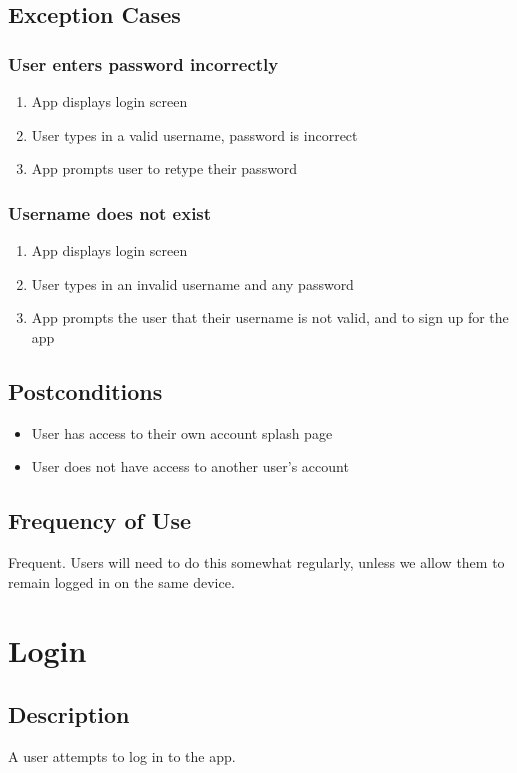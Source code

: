 \documentclass{article}
\begin{document}
	\subsection{Exception Cases}
		\subsubsection{User enters password incorrectly}
			\begin{enumerate}
				\item App displays login screen
				\item User types in a valid username, password is incorrect
				\item App prompts user to retype their password
			\end{enumerate}
		\subsubsection{Username does not exist}
		\begin{enumerate}
			\item App displays login screen
			\item User types in an invalid username and any password
			\item App prompts the user that their username is not valid, and to sign up for the app
		\end{enumerate}
	\subsection{Postconditions}
	\begin{itemize}
		\item User has access to their own account splash page
		\item User does not have access to another user's account
	\end{itemize}

	\subsection{Frequency of Use}
	Frequent. Users will need to do this somewhat regularly, unless we allow them to remain logged in on the same device.
	\section{Login}
	\subsection{Description}
	A user attempts to log in to the app.
\end{document}
